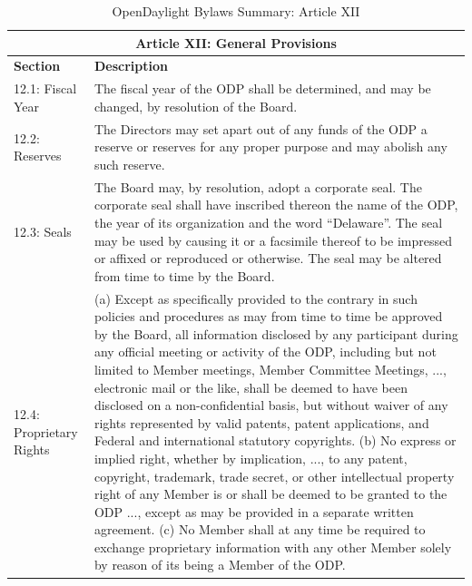 \documentclass[a4paper, 12pt]{book}
\begin{document}
{\begin{table}[H]
  \begin{center}
    \begin{tabular}{ | p{4cm} | p{11cm} | }
    \toprule
    \multicolumn {2}{|c|}{\textbf{Article XII: General Provisions}} \\
    \hline
    \textbf{Section} & \textbf{Description} \\
    \hline
    12.1: Fiscal Year & The fiscal year of the ODP shall be determined, and may be changed, by resolution of the Board.\\
    \hline
    12.2: Reserves & The Directors may set apart out of any funds of the ODP a reserve or reserves for any proper purpose and may abolish any such reserve.\\
    \hline
    12.3: Seals & The Board may, by resolution, adopt a corporate seal.  The corporate seal shall have inscribed thereon the name of the ODP, the year of its organization and the word “Delaware”.  The seal may be used by causing it or a facsimile thereof to be impressed or affixed or reproduced or otherwise.  The seal may be altered from time to time by the Board.\\
    \hline
    12.4: Proprietary Rights & (a) Except as specifically provided to the contrary in such policies and procedures as may from time to time be approved by the Board, all information disclosed by any participant during any official meeting or activity of the ODP, including but not limited to Member meetings, Member Committee Meetings, ..., electronic mail or the like, shall be deemed to have been disclosed on a non-confidential basis, but without waiver of any rights represented by valid patents, patent applications, and Federal and international statutory copyrights. (b)  No express or implied right, whether by implication, ..., to any patent, copyright, trademark, trade secret, or other intellectual property right of any Member is or shall be deemed to be granted to the ODP ..., except as may be provided in a separate written agreement. (c)  No Member shall at any time be required to exchange proprietary information with any other Member solely by reason of its being a Member of the ODP.\\
    \bottomrule
    \end{tabular}
    \caption{OpenDaylight Bylaws Summary: Article XII}
    \label{tab:odlbylaws-art12}
  \end{center}
\end{table}

}
\end{document}
